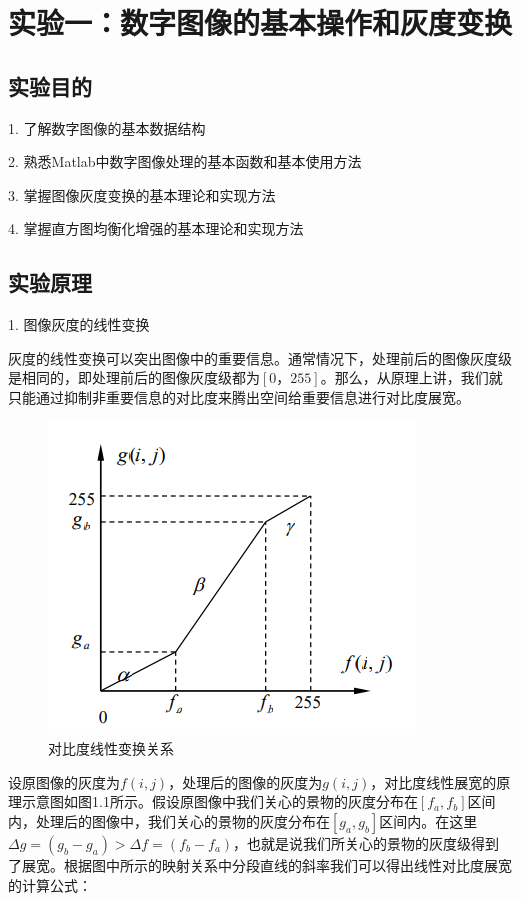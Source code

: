 \documentclass[UTF8]{article} %
\begin{document}
	\tableofcontents
	\thispagestyle{empty}       %
	\clearpage
	
	\setcounter{page}{1}        %
	
	\section{实验一：数字图像的基本操作和灰度变换}
	\subsection{实验目的}
	1. 了解数字图像的基本数据结构
	
	2. 熟悉Matlab中数字图像处理的基本函数和基本使用方法
	
	3. 掌握图像灰度变换的基本理论和实现方法
	
	4. 掌握直方图均衡化增强的基本理论和实现方法
	
	\subsection{实验原理}
	1. 图像灰度的线性变换
	
	灰度的线性变换可以突出图像中的重要信息。通常情况下，处理前后的图像灰度级是相同的，即处理前后的图像灰度级都为$[0，255]$。那么，从原理上讲，我们就只能通过抑制非重要信息的对比度来腾出空间给重要信息进行对比度展宽。
	
	\begin{figure}[H]
		\centering
		\includegraphics[width=0.5\linewidth]{screenshot036}
		\caption{对比度线性变换关系}
		\label{fig:screenshot036}
	\end{figure}
	
	设原图像的灰度为$f(i, j)$，处理后的图像的灰度为$g(i, j)$，对比度线性展宽的原理示意图如图1.1所示。假设原图像中我们关心的景物的灰度分布在$[f_{a},f_{b}]$区间内，处理后的图像中，我们关心的景物的灰度分布在$[g_{a}, g_{b}]$区间内。在这里 $\Delta g = (g_{b}-g_{a})>\Delta f=(f_{b}-f_{a})$，也就是说我们所关心的景物的灰度级得到了展宽。根据图中所示的映射关系中分段直线的斜率我们可以得出线性对比度展宽的计算公式：
\end{document}
